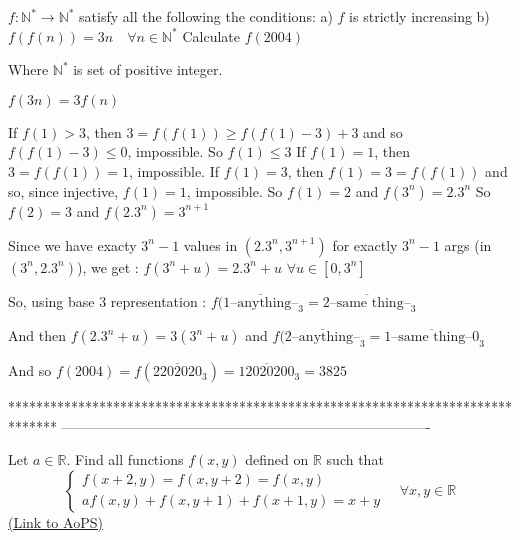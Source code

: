 \begin{solution}
	\begin{tcolorbox}$f: \mathbb{N}^*\to\mathbb{N}^*$ satisfy all the following the conditions:
a) $f$ is strictly increasing
b) $f(f(n))=3n \quad \forall n\in\mathbb{N}^*$
Calculate $f(2004)$

Where $\mathbb{N}^*$ is set of positive integer.\end{tcolorbox}
$f(3n)=3f(n)$

If $f(1)>3$, then $3=f(f(1))\ge f(f(1)-3)+3$ and so $f(f(1)-3)\le 0$, impossible. So $f(1)\le 3$
If $f(1)=1$, then $3=f(f(1))=1$, impossible.
If $f(1)=3$, then $f(1)=3=f(f(1))$ and so, since injective, $f(1)=1$, impossible.
So $f(1)=2$ and $f(3^n)=2.3^n$
So $f(2)=3$ and $f(2.3^n)=3^{n+1}$

Since we have exacty $3^n-1$ values in $(2.3^n,3^{n+1})$ for exactly $3^n-1$ args (in $(3^n,2.3^n)$), we get :
$f(3^n+u)=2.3^n+u$ $\forall u\in[0,3^n]$

So, using base $3$ representation : $f(\overline{1\text{--anything--}}_3=\overline{2\text{--same thing--}}_3$

And then $f(2.3^n+u)=3(3^n+u)$ and $f(\overline{2\text{--anything--}}_3=\overline{1\text{--same thing--}0}_3$

And so $f(2004)=f(\overline{2202020}_3)=\overline{12020200}_3=\boxed{3825}$
\end{solution}
*******************************************************************************
-------------------------------------------------------------------------------

\begin{problem}
	Let $a\in\mathbb R$. Find all functions  $f(x,y)$ defined on $\mathbb R$ such that \[\begin{cases}f(x+2,y)=f(x,y+2)=f(x,y)\\af(x,y)+f(x,y+1)+f(x+1,y)=x+y\end{cases}\quad \forall x,y\in\mathbb R\]
	\flushright \href{https://artofproblemsolving.com/community/c6h569389}{(Link to AoPS)}
\end{problem}



